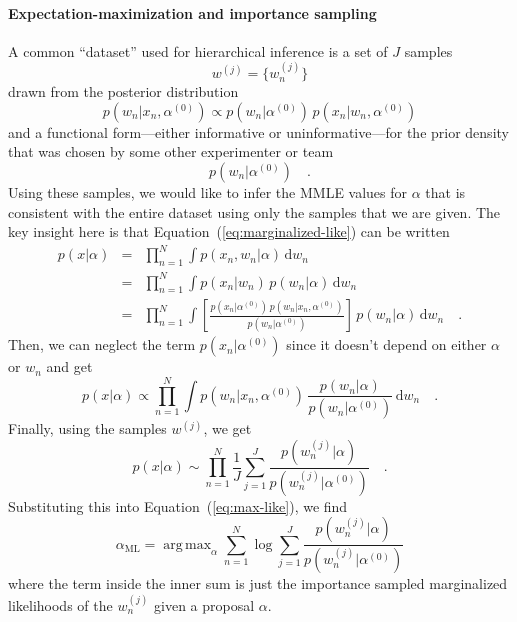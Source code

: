 \documentclass[12pt,preprint]{aastex}
\newcommand{\Eq}[1]{Equation~(\ref{eq:#1})}
\newcommand{\eq}[1]{\Eq{#1}}
\newcommand{\dd}{\,\mathrm{d}}
\newcommand{\pr}[1]{p ( #1 )}
\DeclareMathOperator*{\argmax}{arg\,max}
\begin{document}
\paragraph{Expectation-maximization and importance sampling}
A common ``dataset'' used for hierarchical inference is a set of $J$ samples
\begin{equation}
    w^{(j)} = \{ w_n ^{(j)} \}
\end{equation}
drawn from the posterior distribution
\begin{equation}
    \pr{w_n | x_n, \alpha^{(0)}}
        \propto \pr{w_n | \alpha^{(0)}} \, \pr{x_n | w_n, \alpha^{(0)}}
\end{equation}
and a functional form---either informative or uninformative---for the prior
density that was chosen by some other experimenter or team
\begin{equation}
    \pr{w_n | \alpha^{(0)}} \quad.
\end{equation}
Using these samples, we would like to infer the MMLE values for $\alpha$
that is consistent with the entire dataset using only the samples that
we are given. The key insight here is that \eq{marginalized-like} can be
written
\begin{eqnarray}
    \pr{x | \alpha}
        &=& \prod_{n = 1} ^N \int \pr{x_n, w_n | \alpha} \dd w_n \\
        &=& \prod_{n = 1} ^N \int \pr{x_n | w_n} \, \pr{w_n | \alpha} \dd w_n \\
        &=& \prod_{n = 1} ^N \int
            \left [ \frac{\pr{x_n | \alpha^{(0)}} \,
                \pr{w_n | x_n, \alpha^{(0)}}}{\pr{w_n | \alpha^{(0)}}}  \right ]
            \, \pr{w_n | \alpha} \dd w_n \quad.
\end{eqnarray}
Then, we can neglect the term $\pr{x_n | \alpha^{(0)}}$ since it doesn't
depend on either $\alpha$ or $w_n$ and get
\begin{equation}
    \pr{x | \alpha} \propto \prod_{n = 1} ^N \int \pr{w_n | x_n, \alpha^{(0)}}
        \, \frac{\pr{w_n | \alpha}}{\pr{w_n | \alpha^{(0)}}} \dd w_n \quad.
\end{equation}
Finally, using the samples $w^{(j)}$, we get
\begin{equation}
    \pr{x | \alpha} \sim \prod_{n = 1} ^N \frac{1}{J} \sum_{j=1}^{J}
        \frac{\pr{w_n^{(j)} | \alpha}}{\pr{w_n^{(j)} | \alpha^{(0)}}} \quad.
\end{equation}
Substituting this into \eq{max-like}, we find
\begin{equation}
    \alpha_\mathrm{ML} = \argmax_\alpha \sum_{n=1}^N \log \sum_{j=1}^{J}
        \frac{\pr{w_n^{(j)} | \alpha}}{\pr{w_n^{(j)} | \alpha^{(0)}}}
\end{equation}
where the term inside the inner sum is just the importance sampled
marginalized likelihoods of the $w_n^{(j)}$ given a proposal $\alpha$.




\end{document}
